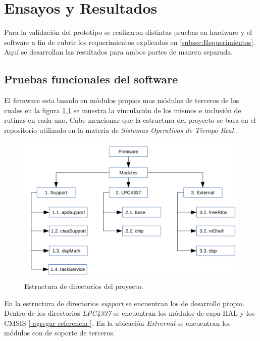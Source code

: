 \chapter{Ensayos y Resultados}
\label{Chapter4}

Para la validación del prototipo se realizaron distintas pruebas en hardware y el software a fin de cubrir los requerimientos explicados en \ref{subsec:Requerimientos}. Aquí se desarrollan las resultados para ambos partes de manera separada.

\section{ Pruebas funcionales del software }
\label{sec:pruebasSW}

El firmware esta basado en módulos propios mas módulos de terceros de los cuales en la figura \ref{fig:diag_Repositorio} se muestra la vinculación de los mismos e inclusión de rutinas en cada uno. Cabe mencionar que la estructura del proyecto se basa en el repositorio utilizado en la materia de \textit{Sistemas Operativos de Tiempo Real} \citep{ws_ridolfi}.   
\begin{figure}[h!]
	\centering
	\includegraphics[width=1.0\textwidth]{Figures/Cap_4/diagrama_repositorio}
	\caption{Estructura de directorios del proyecto.}
	\label{fig:diag_Repositorio}
\end{figure}

En la estructura de directorios \textit{support} se encuentran los  de desarrollo propio. Dentro de los directorios \textit{LPC4337} se encuentran los módulos de capa HAL y los CMSIS \ref{ agregar referencia }. En la ubicación \textit{Extrernal} se encuentran los módulos con  de soporte de terceros.


